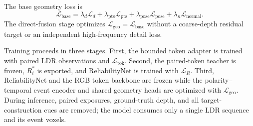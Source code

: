 The base geometry loss is
\begin{equation}
    \mathcal{L}_{\mathrm{base}}=
    \lambda_{d}\mathcal{L}_{d}+
    \lambda_{\mathrm{pts}}\mathcal{L}_{\mathrm{pts}}+
    \lambda_{\mathrm{pose}}\mathcal{L}_{\mathrm{pose}}+
    \lambda_n\mathcal{L}_{\mathrm{normal}}.
\end{equation}
The direct-fusion stage optimizes
$\mathcal{L}_{\mathrm{geo}}=\mathcal{L}_{\mathrm{base}}$ without a
coarse-depth residual target or an independent high-frequency detail loss.

Training proceeds in three stages. First, the bounded token adapter is trained
with paired LDR observations and $\mathcal{L}_{\mathrm{tok}}$. Second, the
paired-token teacher is frozen, $R_i^{\ast}$ is exported, and ReliabilityNet is
trained with $\mathcal{L}_{R}$. Third, ReliabilityNet and the RGB token
backbone are frozen while the polarity--temporal event encoder and shared
geometry heads are optimized with $\mathcal{L}_{\mathrm{geo}}$. During
inference, paired exposures,
ground-truth depth, and all target-construction cues are removed; the model
consumes only a single LDR sequence and its event voxels.
